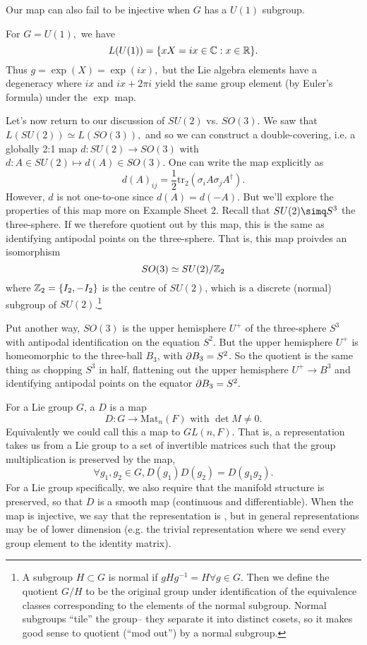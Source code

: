 Our map can also fail to be injective when $G$ has a $U(1)$ subgroup. 
\begin{exm}
For $G=U(1),$ we have 
$$L(U(1))=\{xX=ix \in \mathbb{C}: x\in \mathbb{R}\}.$$
Thus $g=\exp(X)=\exp (ix),$
but the Lie algebra elements have a degeneracy where $ix$ and $ix+2\pi i$ yield the same group element (by Euler's formula) under the $\exp$ map.
\end{exm}

Let's now return to our discussion of $SU(2)$ vs. $SO(3).$ We saw that $L(SU(2))\simeq L(SO(3)),$ and so we can construct a double-covering, i.e. a globally 2:1 map
$d:SU(2)\to SO(3)$ with $d: A\in SU(2) \mapsto d(A) \in SO(3).$ One can write the map explicitly as
$$d(A)_{ij} =\frac{1}{2} \text{tr}_2 (\sigma_i A \sigma_j A^\dagger).$$
However, $d$ is not one-to-one since $d(A)=d(-A).$ But we'll explore the properties of this map more on Example Sheet 2. Recall that $SU(2)\simq S^3$ the three-sphere. If we therefore quotient out by this map, this is the same as identifying antipodal points on the three-sphere. That is, this map proivdes an isomorphism
$$SO(3) \simeq SU(2)/\mathbb{Z}_2$$
where $\mathbb{Z}_2=\{I_2,-I_2\}$ is the centre of $SU(2)$, which is a discrete (normal) subgroup of $SU(2)$.\footnote{A subgroup $H\subset G$ is normal if $gHg^{-1}=H \forall g\in G$. Then we define the quotient $G/H$ to be the original group under identification of the equivalence classes corresponding to the elements of the normal subgroup. Normal subgroups ``tile'' the group-- they separate it into distinct cosets, so it makes good sense to quotient (``mod out'') by a normal subgroup.}

Put another way, $SO(3)$ is the upper hemisphere $U^+$ of the three-sphere $S^3$ with antipodal identification on the equation $S^2$. But the upper hemisphere $U^+$ is homeomorphic to the three-ball $B_3$, with $\partial B_3 = S^2$. So the quotient is the same thing as chopping $S^3$ in half, flattening out the upper hemisphere $U^+\to B^3$ and identifying antipodal points on the equator $\partial B_3 =S^2.$

\begin{defn}
For a Lie group $G$, a  $D$ is a map
$$D:G\to \text{Mat}_n(F)\text{ with }\det M \neq 0.$$
Equivalently we could call this a map to $GL(n,F).$ That is, a representation takes us from a Lie group to a set of invertible matrices such that the group multiplication is preserved by the map,
$$\forall g_1,g_2\in G, D(g_1)D(g_2)=D(g_1g_2).$$
For a Lie group specifically, we also require that the manifold structure is preserved, so that $D$ is a smooth map (continuous and differentiable). When the map is injective, we say that the representation is , but in general representations may be of lower dimension (e.g. the trivial representation where we send every group element to the identity matrix).
\end{defn}

